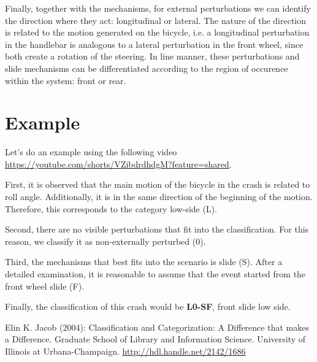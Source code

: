 \documentclass{article}
\begin{document}
Finally, together with the mechanisms, for external perturbations we can identify the direction where they act: longitudinal or lateral.
%
The nature of the direction is related to the motion generated on the bicycle, i.e. a longitudinal perturbation in the handlebar is analogous to a lateral perturbation in the front wheel, since both create a rotation of the steering.
%
In line manner, these perturbations and slide mechanisms can be differentiated according to the region of occurence within the system: front or rear.


\section{Example}

Let's do an example using the following video \url{https://youtube.com/shorts/VZibdrdhdgM?feature=shared}.

First, it is observed that the main motion of the bicycle in the crash is related to roll angle.
%
Additionally, it is in the same direction of the beginning of the motion.
%
Therefore, this corresponds to the category low-side (L).


Second, there are no visible perturbations that fit into the classification.
%
For this reason, we classify it as non-externally perturbed (0).


Third, the mechanisms that best fits into the scenario is slide (S).
%
After a detailed examination, it is reasonable to assume that the event started from the front wheel slide (F).


Finally, the classification of this crash would be \textbf{L0-SF}, front slide low side.

\begin{thebibliography}{9}

     Elin K. Jacob (2004):  Classification and Categorization: A Difference that makes a Difference. Graduate School of Library and Information Science. University of Illinois at Urbana-Champaign. \url{http://hdl.handle.net/2142/1686}

\end{thebibliography}
\end{document}
